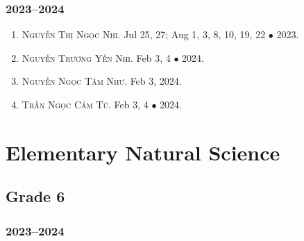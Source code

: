 \documentclass{article}
\begin{document}
\subsubsection{2023--2024}

\begin{enumerate}
	\item \textsc{Nguyễn Thị Ngọc Nhi.} {\sf[In]} Jul 25, 27; Aug 1, 3, 8, 10, 19, 22 $\bullet$ 2023. {\sf[Out]}
	\item \textsc{Nguyễn Trương Yến Nhi.} {\sf[In]} Feb 3, 4 $\bullet$ 2024.
	\item \textsc{Nguyễn Ngọc Tâm Như.} {\sf[In]} Feb 3, 2024. {\sf[Out]}
	\item \textsc{Trần Ngọc Cẩm Tú.} {\sf[In]} Feb 3, 4 $\bullet$ 2024.
\end{enumerate}


\section{Elementary Natural Science}

\subsection{Grade 6}

\subsubsection{2023--2024}
\end{document}
